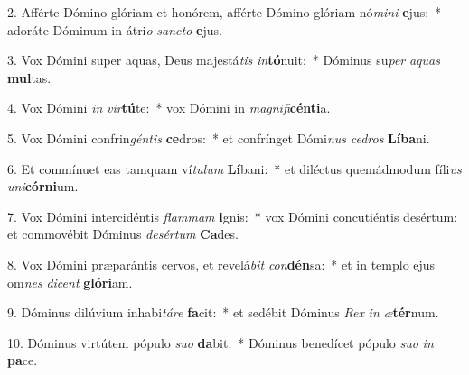 2. Afférte Dómino glóriam et honórem, afférte Dómino glóriam nó\textit{mi}\textit{ni} \textbf{e}jus:~*  adoráte Dóminum in átri\textit{o} \textit{sanc}\textit{to} \textbf{e}jus.\

3. Vox Dómini super aquas, Deus majestá\textit{tis} \textit{in}\textbf{tó}nuit:~*  Dóminus su\textit{per} \textit{a}\textit{quas} \textbf{mul}tas.\

4. Vox Dómini \textit{in} \textit{vir}\textbf{tú}te:~*  vox Dómini in \textit{ma}\textit{gni}\textit{fi}\textbf{cén}\textbf{ti}a.\

5. Vox Dómini confrin\textit{gén}\textit{tis} \textbf{ce}dros:~*  et confrínget Dómi\textit{nus} \textit{ce}\textit{dros} \textbf{Lí}\textbf{ba}ni.\

6. Et commínuet eas tamquam ví\textit{tu}\textit{lum} \textbf{Lí}bani:~*  et diléctus quemádmodum fíli\textit{us} \textit{u}\textit{ni}\textbf{cór}\textbf{ni}um.\

7. Vox Dómini intercidéntis \textit{flam}\textit{mam} \textbf{i}gnis:~*  vox Dómini concutiéntis desértum: et commovébit Dóminus \textit{de}\textit{sér}\textit{tum} \textbf{Ca}des.\

8. Vox Dómini præparántis cervos, et revelá\textit{bit} \textit{con}\textbf{dén}sa:~*  et in templo ejus om\textit{nes} \textit{di}\textit{cent} \textbf{gló}\textbf{ri}am.\

9. Dóminus dilúvium inhabi\textit{tá}\textit{re} \textbf{fa}cit:~*  et sedébit Dóminus \textit{Rex} \textit{in} \textit{æ}\textbf{tér}num.\

10. Dóminus virtútem pópulo \textit{su}\textit{o} \textbf{da}bit:~*  Dóminus benedícet pópulo \textit{su}\textit{o} \textit{in} \textbf{pa}ce.\

